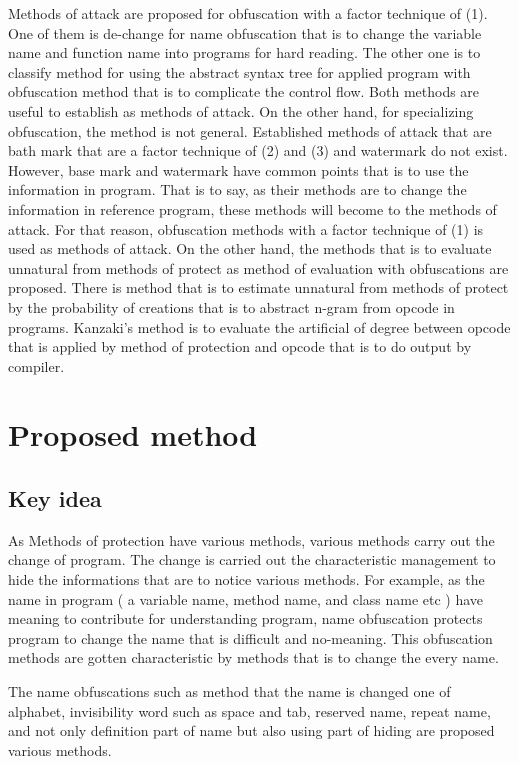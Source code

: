 \documentclass[conference]{IEEEtran}
\begin{document}
Methods of attack are proposed for obfuscation with a factor technique of (1).
One of them is de-change for name obfuscation that is to change the variable name and function name into programs for hard reading\cite{cimato05jss}.
The other one is to classify method for using the abstract syntax tree for applied program with obfuscation method that is to complicate the control flow.
Both methods are useful to establish as methods of attack.
On the other hand, for specializing obfuscation, the method is not general.
Established methods of attack that are bath mark that are a factor technique of (2) and (3) and watermark do not exist.
However, base mark and watermark have common points that is to use the information in program.
That is to say, as their methods are to change the information in reference program, these methods will become to the methods of attack.
For that reason, obfuscation methods with a factor technique of (1) is used as methods of attack\cite{tian13hpcc}.
On the other hand, the methods that is to evaluate unnatural from methods of protect as method of evaluation with obfuscations are proposed\cite{kanzaki14ipsj}.
There is method that is to estimate unnatural from methods of protect by the probability of creations that is to abstract n-gram from opcode in programs.
Kanzaki's method is to evaluate the artificial of degree between opcode that is applied by method of protection and opcode that is to do output by compiler.

\section{Proposed method}

\subsection{Key idea}
As Methods of protection have various methods, various methods carry out the change of program.
The change is carried out the characteristic management to hide the informations that are to notice various methods.
For example, as the name in program ( a variable name, method name, and class name etc ) have meaning to contribute for understanding program,
name obfuscation\cite{tyma00patent} protects program to change the name that is difficult and no-meaning.
This obfuscation methods are gotten characteristic by methods that is to change the every name.

The name obfuscations such as method that the name is changed one of alphabet, invisibility word such as space and tab, reserved name, repeat name\cite{dasho}, and not only definition part of name but also using part of hiding are proposed various methods\cite{tamada07ieice}. 
\end{document}
